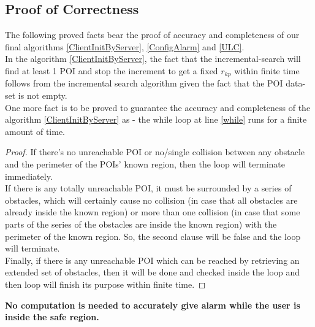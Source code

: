 \documentclass{sig-alternate}
\begin{document}
\subsection{Proof of Correctness}
The following proved facts bear the proof of accuracy and completeness of our final algorithms \ref{ClientInitByServer}, \ref{ConfigAlarm} and \ref{ULC}.\\
In the algorithm \ref{ClientInitByServer}, the fact that the incremental-search will find at least 1 POI and stop the increment to get a fixed $r_{kp}$ within finite time follows from the incremental search algorithm given the fact that the POI data-set is not empty.
\\One more fact is to be proved to guarantee the accuracy and completeness of the algorithm \ref{ClientInitByServer} as - the while loop at line \ref{while} runs for a finite amount of time.

\begin{proof}
If there's no unreachable POI or no/single collision between any obstacle and the perimeter of the POIs' known region, then the loop will terminate immediately.
\\If there is any totally unreachable POI, it must be surrounded by a series of obstacles, which will certainly cause no collision (in case that all obstacles are already inside the known region) or more than one collision (in case that some parts of the series of the obstacles are inside the known region) with the perimeter of the known region. So, the second clause will be false and the loop will terminate.
\\Finally, if there is any unreachable POI which can be reached by retrieving an extended set of obstacles, then it will be done and checked inside the loop and then loop will finish its purpose within finite time.
\end{proof}

\textbf{No computation is needed to accurately give alarm while the user is inside the safe region.}\\
\end{document}
